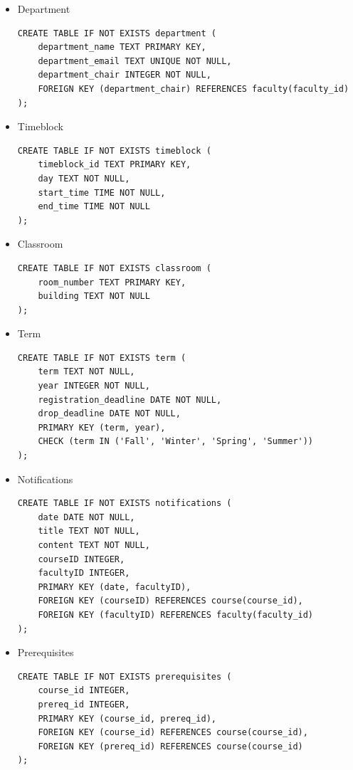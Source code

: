 \documentclass{report}
\begin{document}
\begin{itemize}
    \item Department
    \begin{lstlisting}
CREATE TABLE IF NOT EXISTS department (
    department_name TEXT PRIMARY KEY,
    department_email TEXT UNIQUE NOT NULL,
    department_chair INTEGER NOT NULL,
    FOREIGN KEY (department_chair) REFERENCES faculty(faculty_id)
);
    \end{lstlisting}

    \item Timeblock
    \begin{lstlisting}
CREATE TABLE IF NOT EXISTS timeblock (
    timeblock_id TEXT PRIMARY KEY,
    day TEXT NOT NULL,
    start_time TIME NOT NULL,
    end_time TIME NOT NULL
);
    \end{lstlisting}

    \item Classroom
    \begin{lstlisting}
CREATE TABLE IF NOT EXISTS classroom (
    room_number TEXT PRIMARY KEY,
    building TEXT NOT NULL
);         
    \end{lstlisting}

    \item Term
    \begin{lstlisting}
CREATE TABLE IF NOT EXISTS term (
    term TEXT NOT NULL,
    year INTEGER NOT NULL,
    registration_deadline DATE NOT NULL,
    drop_deadline DATE NOT NULL,
    PRIMARY KEY (term, year),
    CHECK (term IN ('Fall', 'Winter', 'Spring', 'Summer'))
);         
    \end{lstlisting}

    \item Notifications
    \begin{lstlisting}
CREATE TABLE IF NOT EXISTS notifications (
    date DATE NOT NULL,
    title TEXT NOT NULL,
    content TEXT NOT NULL,
    courseID INTEGER,
    facultyID INTEGER,
    PRIMARY KEY (date, facultyID),
    FOREIGN KEY (courseID) REFERENCES course(course_id),
    FOREIGN KEY (facultyID) REFERENCES faculty(faculty_id)
);
    \end{lstlisting}

    \item Prerequisites
    \begin{lstlisting}
CREATE TABLE IF NOT EXISTS prerequisites (
    course_id INTEGER,
    prereq_id INTEGER,
    PRIMARY KEY (course_id, prereq_id),
    FOREIGN KEY (course_id) REFERENCES course(course_id),
    FOREIGN KEY (prereq_id) REFERENCES course(course_id)
);         
    \end{lstlisting}


\end{itemize}
\end{document}
